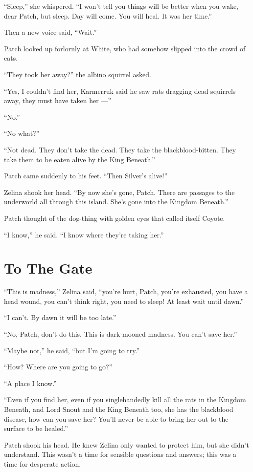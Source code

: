 \documentclass[ebook,oneside,openany,17pt]{memoir}
\newenvironment{tolerant}[1]{%
  \par\tolerance=#1\relax
}{%
  \par
}
\renewcommand{\thechapter}{\Roman{chapter}}
\newcounter{sections}
\newcommand{\sections}[1]{%
  \section*{#1}
  \addtocounter{sections}{1}%
  \pdfbookmark[1]{#1}{section.\thechapter.\thesections}}
\begin{document}
“Sleep,” she whispered. “I won’t tell you things will be better when
you wake, dear Patch, but sleep. Day will come. You will heal. It was
her time.”

Then a new voice said, “Wait.”

\begin{tolerant}{500}
Patch looked up forlornly at White, who had somehow slipped into the
crowd of cats.
\end{tolerant}

“They took her away?” the albino squirrel asked.

“Yes, I couldn’t find her, Karmerruk said he saw rats dragging dead
squirrels away, they must have taken her —”

“No.”

“No what?”

“Not dead. They don’t take the dead. They take the
blackblood-bitten. They take them to be eaten alive by the King
Beneath.”

Patch came suddenly to his feet. “Then Silver’s alive!”

Zelina shook her head. “By now she’s gone, Patch. There are passages
to the underworld all through this island. She’s gone into the Kingdom
Beneath.”

Patch thought of the dog-thing with golden eyes that called itself
Coyote.

“I know,” he said. “I know where they’re taking her.”


\sections{To The Gate}

“This is madness,” Zelina said, “you’re hurt, Patch, you’re exhausted,
you have a head wound, you can’t think right, you need to sleep! At
least wait until dawn.”

“I can’t. By dawn it will be too late.”

“No, Patch, don’t do this. This is dark-mooned madness. You can’t save
her.”

“Maybe not,” he said, “but I’m going to try.”

“How? Where are you going to go?”

“A place I know.”

“Even if you find her, even if you singlehandedly kill all the rats in
the Kingdom Beneath, and Lord Snout and the King Beneath too, she has
the blackblood disease, how can you save her? You’ll never be able to
bring her out to the surface to be healed.”

\begin{tolerant}{2000}
Patch shook his head. He knew Zelina only want\-ed to protect him, but
she didn’t understand. This wasn’t a time for sensible questions and
answers; this was a time for desperate action.
\end{tolerant}
\end{document}
